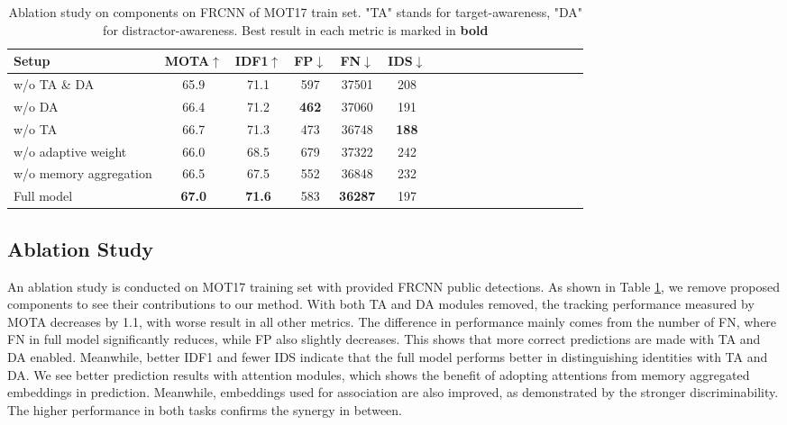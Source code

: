 \documentclass[final]{cvpr}
\begin{document}
\begin{table}[t]
\centering
\small
\setlength\tabcolsep{2pt}
\begin{tabular} {l c c c c c c c c c c c c c c c c c}
	\hline
	\hline
	Setup & MOTA\(\uparrow\) & IDF1\(\uparrow\) & FP\(\downarrow\) & FN\(\downarrow\) & IDS\(\downarrow\)\\
	\hline\hline
	w/o TA \& DA & 65.9 & 71.1 & 597 & 37501 & 208 \\
	w/o DA & 66.4 & 71.2 & \textbf{462} & 37060 & 191 \\
	w/o TA & 66.7 & 71.3 & 473 & 36748 & \textbf{188} \\
	w/o adaptive weight & 66.0 & 68.5 & 679 & 37322 & 242 \\
	w/o memory aggregation & 66.5 & 67.5 & 552 & 36848 & 232 \\
	Full model & \textbf{67.0} & \textbf{71.6} & 583 & \textbf{36287} & 197 \\
	\hline
\end{tabular}
\caption{Ablation study on components on FRCNN of MOT17 train set. "TA" stands for target-awareness, "DA" for distractor-awareness. Best result in each metric is marked in \textbf{bold}}
\label{tab:ablation study: components}
\end{table}

\subsection{Ablation Study}
\label{sec:ablation}
An ablation study is conducted on MOT17 training set with provided FRCNN public detections. As shown in Table \ref{tab:ablation study: components}, we remove proposed components to see their contributions to our method. With both TA and DA modules removed, the tracking performance measured by MOTA decreases by 1.1, with worse result in all other metrics. The difference in performance mainly comes from the number of FN, where FN in full model significantly reduces, while FP also slightly decreases. This shows that more correct predictions are made with TA and DA enabled. Meanwhile, better IDF1 and fewer IDS indicate that the full model performs better in distinguishing identities with TA and DA. We see better prediction results with attention modules, which shows the benefit of adopting attentions from memory aggregated embeddings in prediction. Meanwhile, embeddings used for association are also improved, as demonstrated by the stronger discriminability. The higher performance in both tasks confirms the synergy in between.
\end{document}
